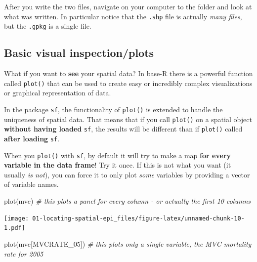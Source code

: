 \documentclass[
]{book}
\newenvironment{Shaded}{\begin{snugshade}}{\end{snugshade}}
\newcommand{\CommentTok}[1]{\textcolor[rgb]{0.56,0.35,0.01}{\textit{#1}}}
\newcommand{\FunctionTok}[1]{\textcolor[rgb]{0.00,0.00,0.00}{#1}}
\newcommand{\NormalTok}[1]{#1}
\newcommand{\StringTok}[1]{\textcolor[rgb]{0.31,0.60,0.02}{#1}}
\newenvironment{rmdnote}[1]
  {
  \begin{itemize}
  \renewcommand{\labelitemi}{
    \raisebox{-.7\height}[0pt][0pt]{
      {\setkeys{Gin}{width=3em,keepaspectratio}\texttt{[image: images/\#1]}}
    }
  }
  \setlength{\fboxsep}{1em}
  \begin{note}
  \item
  }
  {
  \end{note}
  \end{itemize}
  }
\begin{document}
\begin{rmdnote}{note}
After you write the two files, navigate on your computer to the folder and look at what was written. In particular notice that the \texttt{.shp} file is actually \emph{many files}, but the \texttt{.gpkg} is a single file.

\end{rmdnote}

\hypertarget{basic-visual-inspectionplots}{%
\subsection{Basic visual inspection/plots}\label{basic-visual-inspectionplots}}

What if you want to \textbf{see} your spatial data? In base-R there is a powerful function called \texttt{plot()} that can be used to create easy or incredibly complex visualizations or graphical representation of data.

In the package \texttt{sf}, the functionality of \texttt{plot()} is extended to handle the uniqueness of spatial data. That means that if you call \texttt{plot()} on a spatial object \textbf{without having loaded} \texttt{sf}, the results will be different than if \texttt{plot()} called \textbf{after loading} \texttt{sf}.

When you \texttt{plot()} with \texttt{sf}, by default it will try to make a map \textbf{for every variable in the data frame}! Try it once. If this is not what you want (it usually \emph{is not}), you can force it to only plot \emph{some} variables by providing a vector of variable names.

\begin{Shaded}
\begin{Highlighting}[]
\FunctionTok{plot}\NormalTok{(mvc) }\CommentTok{\# this plots a panel for every column {-} or actually the first 10 columns}
\end{Highlighting}
\end{Shaded}

\texttt{[image: 01-locating-spatial-epi\_files/figure-latex/unnamed-chunk-10-1.pdf]}

\begin{Shaded}
\begin{Highlighting}[]
\FunctionTok{plot}\NormalTok{(mvc[}\StringTok{\textquotesingle{}MVCRATE\_05\textquotesingle{}}\NormalTok{]) }\CommentTok{\# this plots only a single variable, the MVC mortality rate for 2005}
\end{Highlighting}
\end{Shaded}
\end{document}

